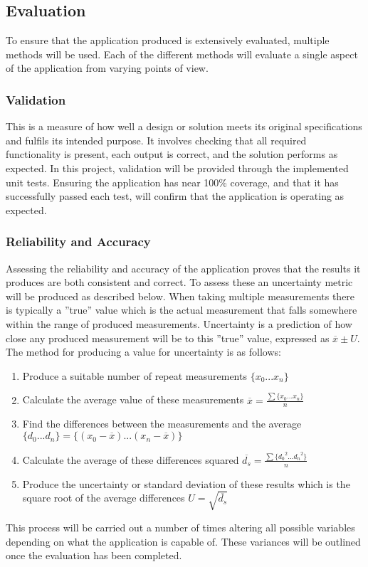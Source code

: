 	\subsection{Evaluation}\label{sec:methodology_evaluation}
		To ensure that the application produced is extensively evaluated, multiple methods will be used. Each of the different methods will evaluate a single aspect of the application from varying points of view.
		\subsubsection{Validation}
			This is a measure of how well a design or solution meets its original specifications and fulfils its intended purpose. It involves checking that all required functionality is present, each output is correct, and the solution performs as expected. In this project, validation will be provided through the implemented unit tests. Ensuring the application has near 100\% coverage, and that it has successfully passed each test, will confirm that the application is operating as expected.
		\subsubsection{Reliability and Accuracy}
			Assessing the reliability and accuracy of the application proves that the results it produces are both consistent and correct. To assess these an uncertainty metric will be produced as described below. When taking multiple measurements there is typically a ”true” value which is the actual measurement that falls somewhere within the range of produced measurements. Uncertainty is a prediction of how close any produced measurement will be to this ”true” value, expressed as $\overline{x} \pm U$. The method for producing a value for uncertainty is as follows:
			\begin{enumerate}
				\item Produce a suitable number of repeat measurements $\{x_0 ... x_n\}$
				\item Calculate the average value of these measurements $\overline{x}=\frac{\sum\{x_0...x_n\}}{n}$
				\item Find the differences between the measurements and the average $\{d_0...d_n\} = \{(x_0-\overline{x})...(x_n-\overline{x})\}$
				\item Calculate the average of these differences squared $\overline{d_s} = \frac{\sum\{{d_0}^2...{d_n}^2\}}{n}$
				\item Produce the uncertainty or standard deviation of these results which is the square root of the average differences $U= \sqrt{\overline{d_s}}$
			\end{enumerate}
			This process will be carried out a number of times altering all possible variables depending on what the application is capable of. These variances will be outlined once the evaluation has been completed.
